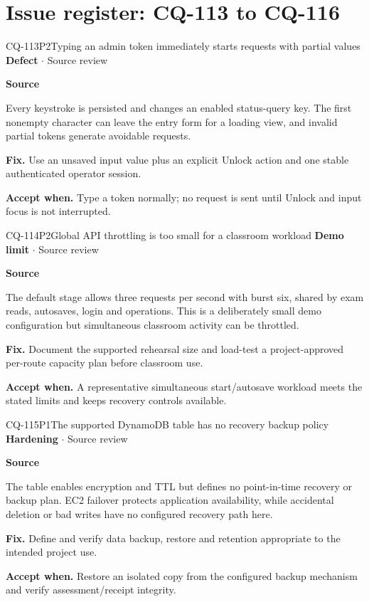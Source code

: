 \section*{Issue register: CQ-113 to CQ-116}
\begin{finding}{CQ-113}{P2}{Typing an admin token immediately starts requests with partial values}
\textbf{Defect} $\cdot$ Source review\par
\textbf{Source}\quad{}\par
Every keystroke is persisted and changes an enabled status-query key. The first nonempty character can leave the entry form for a loading view, and invalid partial tokens generate avoidable requests.\par
\textbf{Fix.} Use an unsaved input value plus an explicit Unlock action and one stable authenticated operator session.\par
\textbf{Accept when.} Type a token normally; no request is sent until Unlock and input focus is not interrupted.
\end{finding}
\begin{finding}{CQ-114}{P2}{Global API throttling is too small for a classroom workload}
\textbf{Demo limit} $\cdot$ Source review\par
\textbf{Source}\quad{}\par
The default stage allows three requests per second with burst six, shared by exam reads, autosaves, login and operations. This is a deliberately small demo configuration but simultaneous classroom activity can be throttled.\par
\textbf{Fix.} Document the supported rehearsal size and load-test a project-approved per-route capacity plan before classroom use.\par
\textbf{Accept when.} A representative simultaneous start/autosave workload meets the stated limits and keeps recovery controls available.
\end{finding}
\begin{finding}{CQ-115}{P1}{The supported DynamoDB table has no recovery backup policy}
\textbf{Hardening} $\cdot$ Source review\par
\textbf{Source}\quad{}\par
The table enables encryption and TTL but defines no point-in-time recovery or backup plan. EC2 failover protects application availability, while accidental deletion or bad writes have no configured recovery path here.\par
\textbf{Fix.} Define and verify data backup, restore and retention appropriate to the intended project use.\par
\textbf{Accept when.} Restore an isolated copy from the configured backup mechanism and verify assessment/receipt integrity.
\end{finding}
